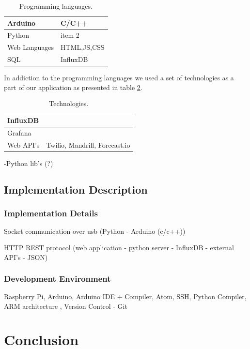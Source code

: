 \documentclass[12pt]{article}
\begin{document}
\begin{table}[H]
\begin{tabularx}{0.8\textwidth}{ |l|X| }
  	\hline
  	Arduino  & C/C++  \\
 	\hline
 	Python  & item 2   \\
  	\hline
 	Web Languages  & HTML,JS,CSS   \\
	\hline
	SQL  & InfluxDB   \\
	\hline
\end{tabularx}
	\caption{Programming languages.}
  	\label{tab:prolangs}
\end{table}

In addiction to the programming languages we used a set of technologies as a part of our application as presented in table \ref{tab:tech}.

\begin{table}[H]
\begin{tabularx}{0.8\textwidth}{ |l|X| }
  	\hline
  	InfluxDB  &   \\
 	\hline
 	Grafana  &   \\
  	\hline
 	Web API's & Twilio, Mandrill, Forecast.io   \\
	\hline
\end{tabularx}
	\caption{Technologies.}
  	\label{tab:tech}
\end{table}

-Python lib's (?)

\subsection{Implementation Description}

\subsubsection{Implementation Details}

Socket communication over usb (Python - Arduino (c/c++))

HTTP REST protocol  (web application - python server - InfluxDB - external API's - JSON)

\subsubsection{Development Environment}

Raspberry Pi, Arduino, Arduino IDE  + Compiler, Atom, SSH, Python Compiler, ARM architecture , Version Control - Git

\newpage
\section{Conclusion}
\end{document}
